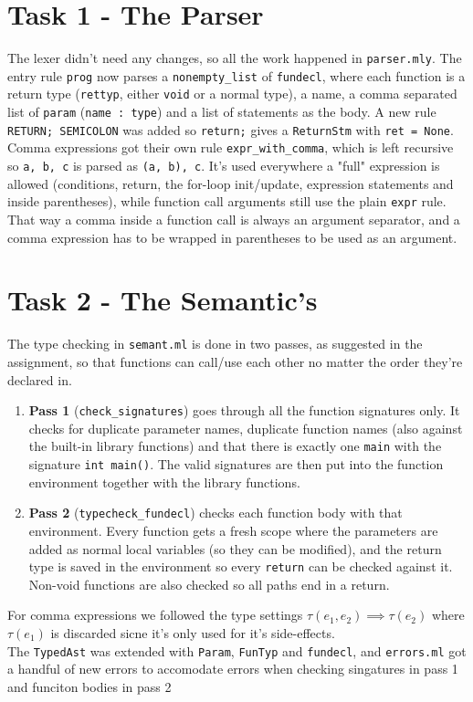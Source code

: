 \documentclass[12pt]{article}
\begin{document}
\section*{Task 1 - The Parser}
The lexer didn't need any changes, so all the work happened in \texttt{parser.mly}. The entry rule \texttt{prog} now parses a \texttt{nonempty\_list} of \texttt{fundecl}, where each function is a return type (\texttt{rettyp}, either \texttt{void} or a normal type), a name, a comma separated list of \texttt{param} (\texttt{name : type}) and a list of statements as the body. A new rule \texttt{RETURN; SEMICOLON} was added so \texttt{return;} gives a \texttt{ReturnStm} with \texttt{ret = None}.\\
\newline
Comma expressions got their own rule \texttt{expr\_with\_comma}, which is left recursive so \texttt{a, b, c} is parsed as \texttt{(a, b), c}. It's used everywhere a "full" expression is allowed (conditions, return, the for-loop init/update, expression statements and inside parentheses), while function call arguments still use the plain \texttt{expr} rule. That way a comma inside a function call is always an argument separator, and a comma expression has to be wrapped in parentheses to be used as an argument.

\section*{Task 2 - The Semantic's}
The type checking in \texttt{semant.ml} is done in two passes, as suggested in the assignment, so that functions can call/use each other no matter the order they're declared in.
\begin{enumerate}
    \item \textbf{Pass 1} (\texttt{check\_signatures}) goes through all the function signatures only. It checks for duplicate parameter names, duplicate function names (also against the built-in library functions) and that there is exactly one \texttt{main} with the signature \texttt{int main()}. The valid signatures are then put into the function environment together with the library functions.
    \item \textbf{Pass 2} (\texttt{typecheck\_fundecl}) checks each function body with that environment. Every function gets a fresh scope where the parameters are added as normal local variables (so they can be modified), and the return type is saved in the environment so every \texttt{return} can be checked against it. Non-void functions are also checked so all paths end in a return.
\end{enumerate}
For comma expressions we followed the type settings $\tau(e_1,e_2) \implies \tau(e_2)$ where $\tau(e_1)$ is discarded sicne it's only used for it's side-effects.\\
\newline
The \texttt{TypedAst} was extended with \texttt{Param}, \texttt{FunTyp} and \texttt{fundecl}, and \texttt{errors.ml} got a handful of new errors to accomodate errors when checking singatures in pass 1 and funciton bodies in pass 2\\
\end{document}
